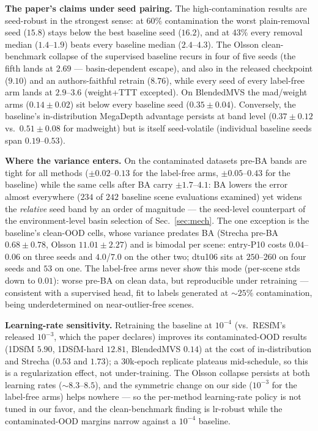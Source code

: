 \documentclass[10pt,twocolumn,letterpaper]{article}
\begin{document}
\noindent\textbf{The paper's claims under seed pairing.} The high-contamination results
are seed-robust in the strongest sense: at $60\%$ contamination the worst plain-removal
seed ($15.8$) stays below the best baseline seed ($16.2$), and at $43\%$ every removal
median ($1.4$--$1.9$) beats every baseline median ($2.4$--$4.3$). The Olsson clean-benchmark
collapse of the supervised baseline recurs in four of five seeds (the fifth lands at
$2.69$ --- basin-dependent escape), and also in the released checkpoint ($9.10$) and an
authors-faithful retrain ($8.76$), while every seed of every label-free arm lands at
$2.9$--$3.6$ (weight+TTT excepted). On BlendedMVS the mad/weight arms ($0.14\pm0.02$)
sit below every baseline seed ($0.35\pm0.04$). Conversely, the baseline's in-distribution
MegaDepth advantage persists at band level ($0.37\pm0.12$ vs.\ $0.51\pm0.08$ for
madweight) but is itself seed-volatile (individual baseline seeds span $0.19$--$0.53$).

\noindent\textbf{Where the variance enters.} On the contaminated datasets pre-BA bands
are tight for all methods ($\pm0.02$--$0.13$ for the label-free arms, $\pm0.05$--$0.43$
for the baseline) while the same cells after BA carry $\pm1.7$--$4.1$: BA lowers the
error almost everywhere ($234$ of $242$ baseline scene evaluations examined) yet widens
the \emph{relative} seed band by an order of magnitude --- the seed-level counterpart of
the environment-level basin selection of Sec.~\ref{sec:mech}. The one exception is the
baseline's clean-OOD cells, whose variance predates BA (Strecha pre-BA $0.68\pm0.78$,
Olsson $11.01\pm2.27$) and is bimodal per scene: entry-P10 costs $0.04$--$0.06$ on three
seeds and $4.0$/$7.0$ on the other two; dtu106 sits at $250$--$260$ on four seeds and
$53$ on one. The label-free arms never show this mode (per-scene stds down to $0.01$):
worse pre-BA on clean data, but reproducible under retraining --- consistent with a
supervised head, fit to labels generated at ${\sim}25\%$ contamination, being
underdetermined on near-outlier-free scenes.

\noindent\textbf{Learning-rate sensitivity.} Retraining the baseline at $10^{-4}$
(vs.\ RESfM's released $10^{-3}$, which the paper declares) improves its
contaminated-OOD results (1DSfM $5.90$, 1DSfM-hard $12.81$, BlendedMVS $0.14$) at the
cost of in-distribution and Strecha ($0.53$ and $1.73$); a $30$k-epoch replicate plateaus
mid-schedule, so this is a regularization effect, not under-training. The Olsson collapse
persists at both learning rates ($\sim\!8.3$--$8.5$), and the symmetric change on our
side ($10^{-3}$ for the label-free arms) helps nowhere --- so the per-method
learning-rate policy is not tuned in our favor, and the clean-benchmark finding is
lr-robust while the contaminated-OOD margins narrow against a $10^{-4}$ baseline.
\end{document}
